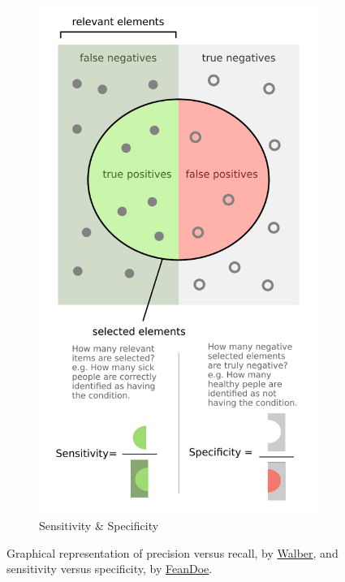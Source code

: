 \begin{figure}
\begin{subfigure}[c]{0.48\textwidth}
  \includegraphics[width=\textwidth]{figures/ml/sensitivity_and_specificity.pdf}
  \caption{Sensitivity \& Specificity}
  \label{fig:graphical_CM_quantities:sensitivity_specificity}
  \end{subfigure}
\caption{
Graphical representation of
precision versus recall, by \href{https://commons.wikimedia.org/wiki/File:Precisionrecall.svg}{Walber},
and
sensitivity versus specificity, by \href{http://en.wikipedia.org/wiki/File:Sensitivity_and_specificity.svg}{FeanDoe}.
}
\label{fig:graphical_CM_quantities}
\end{figure}

